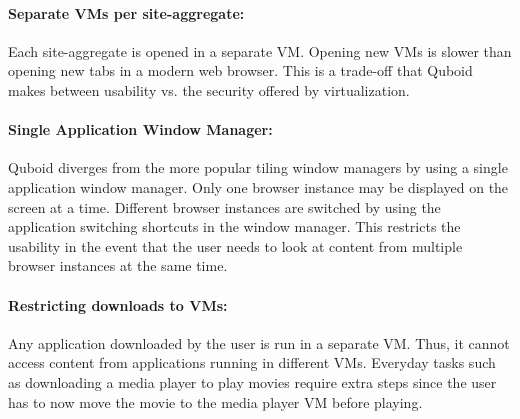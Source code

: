 \paragraph{Separate VMs per site-aggregate:} Each site-aggregate is opened in a separate VM. Opening new VMs is slower than opening new tabs in a modern web browser. This is a trade-off that Quboid makes between usability vs. the security offered by virtualization.

\paragraph{Single Application Window Manager:} Quboid diverges from the more popular tiling window managers by using a single application window manager. Only one browser instance may be displayed on the screen at a time. Different browser instances are switched by using the application switching shortcuts in the window manager. This restricts the usability in the event that the user needs to look at content from multiple browser instances at the same time.

\paragraph{Restricting downloads to VMs:} Any application downloaded by the user is run in a separate VM. Thus, it cannot access content from applications running in different VMs. Everyday tasks such as downloading a media player to play movies require extra steps since the user has to now move the movie to the media player VM before playing.
